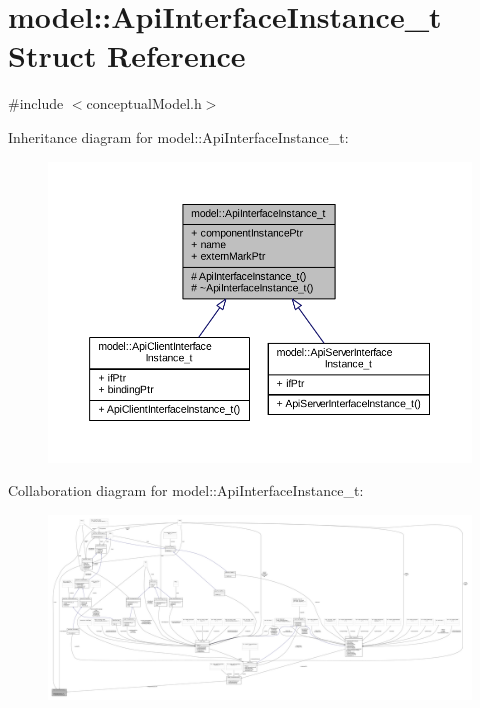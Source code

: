 \hypertarget{structmodel_1_1_api_interface_instance__t}{}\section{model\+:\+:Api\+Interface\+Instance\+\_\+t Struct Reference}
\label{structmodel_1_1_api_interface_instance__t}


{\ttfamily \#include $<$conceptual\+Model.\+h$>$}



Inheritance diagram for model\+:\+:Api\+Interface\+Instance\+\_\+t\+:
\nopagebreak
\begin{figure}[H]
\begin{center}
\leavevmode
\includegraphics[width=350pt]{structmodel_1_1_api_interface_instance__t__inherit__graph}
\end{center}
\end{figure}


Collaboration diagram for model\+:\+:Api\+Interface\+Instance\+\_\+t\+:
\nopagebreak
\begin{figure}[H]
\begin{center}
\leavevmode
\includegraphics[width=350pt]{structmodel_1_1_api_interface_instance__t__coll__graph}
\end{center}
\end{figure}
